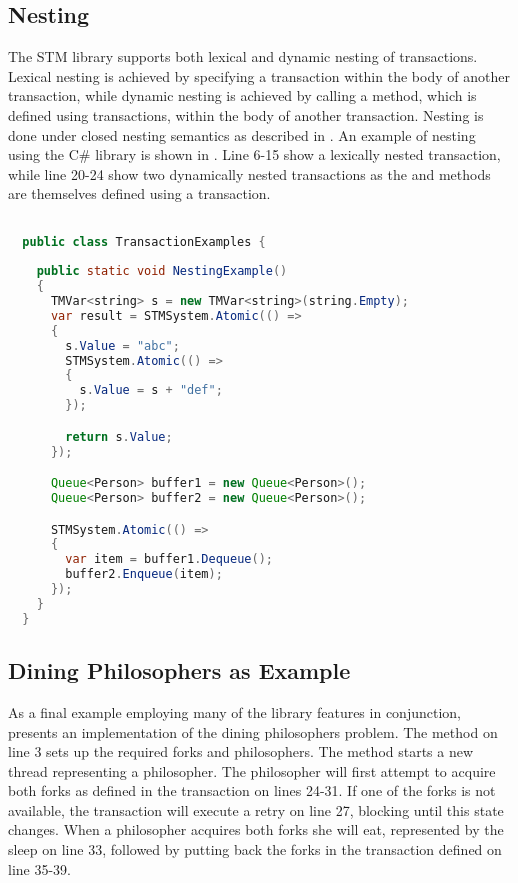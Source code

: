 \subsection{Nesting}
The \ac{STM} library supports both lexical and dynamic nesting of transactions. Lexical nesting is achieved by specifying a transaction within the body of another transaction, while dynamic nesting is achieved by calling a method, which is defined using transactions, within the body of another transaction. Nesting is done under closed nesting semantics as described in . An example of nesting using the C\# library is shown in . Line 6-15 show a lexically nested transaction, while line 20-24 show two dynamically nested transactions as the  and  methods are themselves defined using a transaction. 
\begin{lstlisting}[label=lst:library_nesting,
  caption={Library Nesting},
  language=Java,  
  showspaces=false,
  showtabs=false,
  breaklines=true,
  showstringspaces=false,
  breakatwhitespace=true,
  commentstyle=\color{greencomments},
  keywordstyle=\color{bluekeywords},
  stringstyle=\color{redstrings},
  morekeywords={atomic, retry, orElse, var, get, set}]  % Start your code-block

  public class TransactionExamples {
    
    public static void NestingExample()
    {
      TMVar<string> s = new TMVar<string>(string.Empty);
      var result = STMSystem.Atomic(() =>
      {
        s.Value = "abc";
        STMSystem.Atomic(() =>
        {
          s.Value = s + "def";
        });

        return s.Value;
      });

      Queue<Person> buffer1 = new Queue<Person>();
      Queue<Person> buffer2 = new Queue<Person>();

      STMSystem.Atomic(() =>
      {
        var item = buffer1.Dequeue();
        buffer2.Enqueue(item);
      });
    }
  }
\end{lstlisting}
\subsection{Dining Philosophers as Example}
As a final example employing many of the library features in conjunction,  presents an implementation of the dining philosophers problem\cite[p. 673]{hoare1978communicating}.  The  method on line 3 sets up the required forks and philosophers. The  method starts a new thread representing a philosopher. The philosopher will first attempt to acquire both forks as defined in the transaction on lines 24-31. If one of the forks is not available, the transaction will execute a retry on line 27, blocking until this state changes. When a philosopher acquires both forks she will eat, represented by the sleep on line 33, followed by putting back the forks in the transaction defined on line 35-39.

